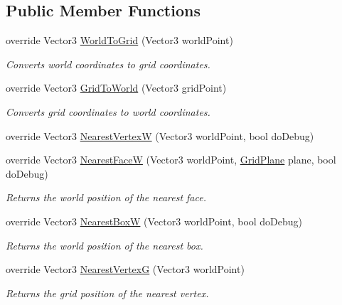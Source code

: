 \subsection*{Public Member Functions}
\begin{DoxyCompactItemize}
\item 
override Vector3 \hyperlink{class_g_f_rect_grid_ac668541585726a76ba85d1e15ca45753_ac668541585726a76ba85d1e15ca45753}{World\+To\+Grid} (Vector3 world\+Point)
\begin{DoxyCompactList}\small\item\em Converts world coordinates to grid coordinates.\end{DoxyCompactList}\item 
override Vector3 \hyperlink{class_g_f_rect_grid_acdc111b97728b0fef0c32e2d96d59f90_acdc111b97728b0fef0c32e2d96d59f90}{Grid\+To\+World} (Vector3 grid\+Point)
\begin{DoxyCompactList}\small\item\em Converts grid coordinates to world coordinates.\end{DoxyCompactList}\item 
override Vector3 \hyperlink{class_g_f_rect_grid_a5c6ed872be90dad1f7868576d513fa05_a5c6ed872be90dad1f7868576d513fa05}{Nearest\+Vertex\+W} (Vector3 world\+Point, bool do\+Debug)
\item 
override Vector3 \hyperlink{class_g_f_rect_grid_a8a81dba8cdb3224a5e3952f903c80d31_a8a81dba8cdb3224a5e3952f903c80d31}{Nearest\+Face\+W} (Vector3 world\+Point, \hyperlink{namespace_grid_framework_aa55de93079e09bd55c4cb660025820d5_aa55de93079e09bd55c4cb660025820d5}{Grid\+Plane} plane, bool do\+Debug)
\begin{DoxyCompactList}\small\item\em Returns the world position of the nearest face.\end{DoxyCompactList}\item 
override Vector3 \hyperlink{class_g_f_rect_grid_a36755945173349f1d24c3a41092bc6f4_a36755945173349f1d24c3a41092bc6f4}{Nearest\+Box\+W} (Vector3 world\+Point, bool do\+Debug)
\begin{DoxyCompactList}\small\item\em Returns the world position of the nearest box.\end{DoxyCompactList}\item 
override Vector3 \hyperlink{class_g_f_rect_grid_a9077b997603860bf0544ceed66325109_a9077b997603860bf0544ceed66325109}{Nearest\+Vertex\+G} (Vector3 world\+Point)
\begin{DoxyCompactList}\small\item\em Returns the grid position of the nearest vertex.\end{DoxyCompactList}\item 

\end{DoxyCompactItemize}
